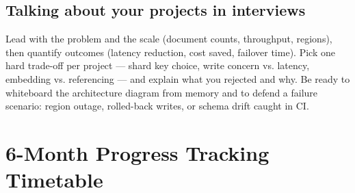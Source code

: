 \documentclass[11pt, a4paper]{article}
\begin{document}
\subsection*{Talking about your projects in interviews}
Lead with the problem and the scale (document counts, throughput, regions), then quantify outcomes (latency reduction, cost saved, failover time). Pick one hard trade-off per project --- shard key choice, write concern vs. latency, embedding vs. referencing --- and explain what you rejected and why. Be ready to whiteboard the architecture diagram from memory and to defend a failure scenario: region outage, rolled-back writes, or schema drift caught in CI.

\newpage
\section{6-Month Progress Tracking Timetable}
\end{document}
